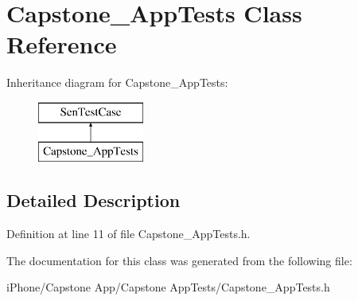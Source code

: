 \hypertarget{interface_capstone___app_tests}{\section{Capstone\-\_\-\-App\-Tests Class Reference}
\label{interface_capstone___app_tests}
}
Inheritance diagram for Capstone\-\_\-\-App\-Tests\-:\begin{figure}[H]
\begin{center}
\leavevmode
\includegraphics[height=2.000000cm]{interface_capstone___app_tests}
\end{center}
\end{figure}


\subsection{Detailed Description}


Definition at line 11 of file Capstone\-\_\-\-App\-Tests.\-h.



The documentation for this class was generated from the following file\-:\begin{DoxyCompactItemize}
\item 
i\-Phone/\-Capstone App/\-Capstone App\-Tests/Capstone\-\_\-\-App\-Tests.\-h\end{DoxyCompactItemize}
